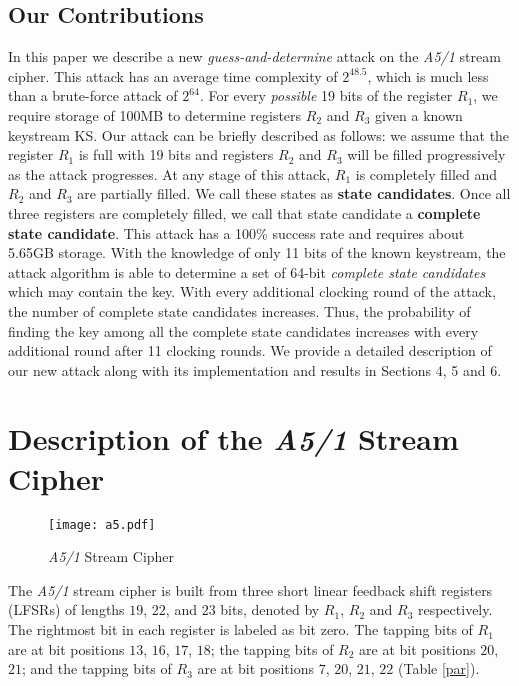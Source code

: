 \documentclass{llncs}
\begin{document}
\subsection{Our Contributions}
In this paper we describe a new \emph{guess-and-determine} attack on the \emph {A5/1} stream cipher. This attack has an average time complexity of $2^{48.5}$, which is much less than a brute-force attack of $2^{64}$. For every \emph{possible} 19 bits of the register $R_1$, we require storage of 100MB to determine registers $R_2$ and $R_3$ given a known keystream KS. Our attack can be briefly described as follows: we assume that the register $R_1$ is full with 19 bits and registers $R_2$ and $R_3$ will be filled progressively as the attack progresses. At any stage of this attack, $R_1$ is completely filled and $R_2$ and $R_3$ are partially filled. We call these states as \textbf{state candidates}. Once all three registers are completely filled, we call that state candidate a \textbf{complete state candidate}. 
This attack has a 100\% success rate and requires about 5.65GB storage. With the knowledge of only 11 bits of the known keystream, the attack algorithm is able to determine a set of 64-bit \emph{complete state candidates} which may contain the key. With every additional clocking round of the attack, the number of complete state candidates increases. Thus, the probability of finding the key among all the complete state candidates increases with every additional round after 11 clocking rounds. We provide a detailed description of our new attack along with its implementation and results in Sections 4, 5 and 6.

\section{Description of the \emph {A5/1} Stream Cipher}
\begin{figure}[!htb]
\begin{center}
\hspace*{-1cm}
\texttt{[image: a5.pdf]}
\caption{\emph{A5/1} Stream Cipher}
\label{a}
\end{center}
\end{figure}
The \emph {A5/1} stream cipher is built from three short linear feedback
shift registers (LFSRs) of lengths $19$, $22$, and $23$ bits, denoted by $R_{1}$, $R_{2}$ and $R_{3}$ respectively. The rightmost bit in each register is labeled as bit zero. The tapping bits of $R_{1}$ are at bit positions $13$, $16$, $17$, $18$; the tapping bits of $ R_{2} $ are at bit positions $20$, $21$; and the tapping bits of $R_{3}$ are at bit positions $7$, $20$, $21$, $22$ (Table \ref{par}). 
\end{document}
